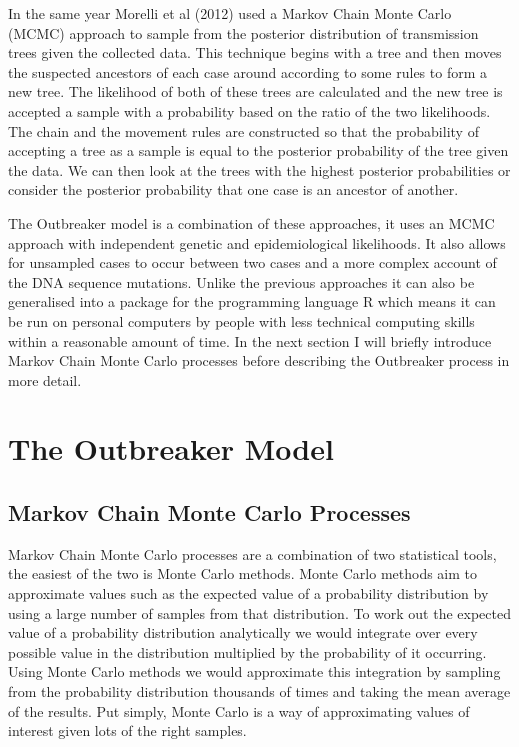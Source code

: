 \documentclass{amsbook}
\begin{document}
In the same year Morelli et al (2012) used a Markov Chain Monte Carlo (MCMC) approach to sample from the posterior distribution of transmission trees given the collected data. This technique begins with a tree and then moves the suspected ancestors of each case around according to some rules to form a new tree. The likelihood of both of these trees are calculated and the new tree is accepted a sample with a probability based on the ratio of the two likelihoods. The chain and the movement rules are constructed so that the probability of accepting a tree as a sample is equal to the posterior probability of the tree given the data. We can then look at the trees with the highest posterior probabilities or consider the posterior probability that one case is an ancestor of another.

The Outbreaker model is a combination of these approaches, it uses an MCMC approach with independent genetic and epidemiological likelihoods. It also allows for unsampled cases to occur between two cases and a more complex account of the DNA sequence mutations. Unlike the previous approaches it can also be generalised into a package for the programming language R which means it can be run on personal computers by people with less technical computing skills within a reasonable amount of time. In the next section I will briefly introduce Markov Chain Monte Carlo processes before describing the Outbreaker process in more detail.

\section{The Outbreaker Model}
\subsection{Markov Chain Monte Carlo Processes}
Markov Chain Monte Carlo processes are a combination of two statistical tools, the easiest of the two is Monte Carlo methods. Monte Carlo methods aim to approximate values such as the expected value of a probability distribution by using a large number of samples from that distribution. To work out the expected value of a probability distribution analytically we would integrate over every possible value in the distribution multiplied by the probability of it occurring. Using Monte Carlo methods we would approximate this integration by sampling from the probability distribution thousands of times and taking the mean average of the results. Put simply, Monte Carlo is a way of approximating values of interest given lots of the right samples.
\end{document}
